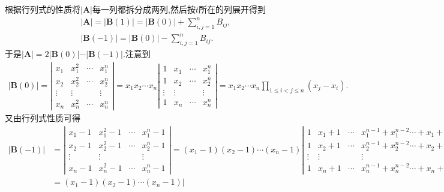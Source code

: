 \documentclass[lang=cn,newtx,10pt,scheme=chinese]{elegantbook}
\begin{document}
\begin{solution}
根据行列式的性质将\(\vert\boldsymbol{A}\vert\)每一列都拆分成两列,然后按\(t\)所在的列展开得到
\begin{gather*}
\vert\boldsymbol{A}\vert=\vert\boldsymbol{B}(1)\vert=\vert\boldsymbol{B}(0)\vert+\sum_{i,j = 1}^{n}B_{ij},
\\
\vert\boldsymbol{B}(-1)\vert=\vert\boldsymbol{B}(0)\vert-\sum_{i,j = 1}^{n}B_{ij}.
\end{gather*}
于是\(\vert\boldsymbol{A}\vert = 2\vert\boldsymbol{B}(0)\vert - \vert\boldsymbol{B}(-1)\vert\).注意到
\begin{align*}
\vert\boldsymbol{B}(0)\vert=\left|\begin{matrix}
x_1 & x_{1}^{2} & \cdots & x_{1}^{n}\\
x_2 & x_{2}^{2} & \cdots & x_{2}^{n}\\
\vdots & \vdots &  & \vdots\\
x_n & x_{n}^{2} & \cdots & x_{n}^{n}
\end{matrix}\right|=x_1x_2\cdots x_n\left|\begin{matrix}
1 & x_1 & \cdots & x_{1}^{n}\\
1 & x_2 & \cdots & x_{2}^{n}\\
\vdots & \vdots &  & \vdots\\
1 & x_n & \cdots & x_{n}^{n}
\end{matrix}\right|=x_1x_2\cdots x_n\prod_{1\leqslant i < j\leqslant n}(x_j - x_i). 
\end{align*}
又由行列式性质可得
\begin{align*}
\vert\boldsymbol{B}(-1)\vert&=\left|\begin{matrix}
x_1 - 1 & x_{1}^{2} - 1 & \cdots & x_{1}^{n} - 1\\
x_2 - 1 & x_{2}^{2} - 1 & \cdots & x_{2}^{n} - 1\\
\vdots & \vdots &  & \vdots\\
x_n - 1 & x_{n}^{2} - 1 & \cdots & x_{n}^{n} - 1
\end{matrix}\right|
=(x_1 - 1)(x_2 - 1)\cdots (x_n - 1)\left|\begin{matrix}
1 & x_1 + 1 & \cdots & x_{1}^{n - 1} + x_{1}^{n - 2}\cdots + x_1 + 1\\
1 & x_2 + 1 & \cdots & x_{2}^{n - 1} + x_{2}^{n - 2}\cdots + x_2 + 1\\
\vdots & \vdots &  & \vdots\\
1 & x_n + 1 & \cdots & x_{n}^{n - 1} + x_{n}^{n - 2}\cdots + x_n + 1
\end{matrix}\right|
\\
&=(x_1 - 1)(x_2 - 1)\cdots (x_n - 1)\left|\begin{matrix}

\end{matrix}
\end{align*}
\end{solution}
\end{document}
